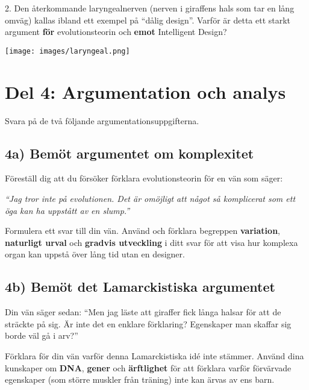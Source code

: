 \documentclass[12pt,a4paper]{article}
\begin{document}
\vspace{5em}

2. Den återkommande laryngealnerven (nerven i giraffens hals som tar en lång omväg) kallas ibland ett exempel på ``dålig design''. Varför är detta ett starkt argument \textbf{för} evolutionsteorin och \textbf{emot} Intelligent Design?

\vspace{5em}

\begin{center}
    \texttt{[image: images/laryngeal.png]}
\end{center}

\newpage

\section*{Del 4: Argumentation och analys}

Svara på de två följande argumentationsuppgifterna.

\subsection*{4a) Bemöt argumentet om komplexitet}

Föreställ dig att du försöker förklara evolutionsteorin för en vän som säger:

\textit{``Jag tror inte på evolutionen. Det är omöjligt att något så komplicerat som ett öga kan ha uppstått av en slump.''}

Formulera ett svar till din vän. Använd och förklara begreppen \textbf{variation}, \textbf{naturligt urval} och \textbf{gradvis utveckling} i ditt svar för att visa hur komplexa organ kan uppstå över lång tid utan en designer.

\vspace{8em}

\subsection*{4b) Bemöt det Lamarckistiska argumentet}

Din vän säger sedan: ``Men jag läste att giraffer fick långa halsar för att de sträckte på sig. Är inte det en enklare förklaring? Egenskaper man skaffar sig borde väl gå i arv?''

Förklara för din vän varför denna Lamarckistiska idé inte stämmer. Använd dina kunskaper om \textbf{DNA}, \textbf{gener} och \textbf{ärftlighet} för att förklara varför förvärvade egenskaper (som större muskler från träning) inte kan ärvas av ens barn.
\end{document}
